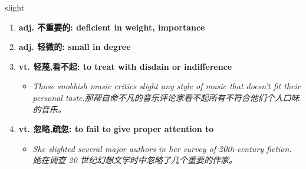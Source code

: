 
\begin{frame}
{\huge slight}
\begin{center}
\begin{enumerate}\Large
  \item \textbf{adj. 不重要的: deficient in weight, importance}
  \item \textbf{adj. 轻微的: small in degree}
  \item \textbf{vt. 轻蔑,看不起: to treat with disdain or indifference}
  \begin{itemize}
    \item \em{\Large{Those snobbish music critics slight any style of music that doesn't fit their personal taste.那帮自命不凡的音乐评论家看不起所有不符合他们个人口味的音乐。}}
  \end{itemize}
  \item \textbf{vt. 忽略,疏忽: to fail to give proper attention to}
  \begin{itemize}
    \item \em{\Large{She slighted several major authors in her survey of 20th-century fiction. 她在调查 20 世纪幻想文学时中忽略了几个重要的作家。}}
  \end{itemize}
\end{enumerate}
\end{center}
\end{frame}
